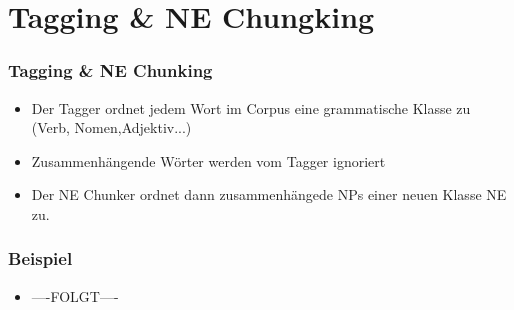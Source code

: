 \section{Tagging \& NE Chungking}

\begin{frame}
  \frametitle{Tagging \& NE Chunking}
  \begin{itemize}
    \item Der Tagger ordnet jedem Wort im Corpus eine grammatische Klasse zu (Verb, Nomen,Adjektiv...)
    \item Zusammenhängende Wörter werden vom Tagger ignoriert
    \item Der NE Chunker ordnet dann zusammenhängede NPs einer neuen Klasse NE zu.
  \end{itemize}
\end{frame}

\begin{frame}
  \frametitle{Beispiel}
  \begin{itemize}
    \item ----FOLGT----
  \end{itemize}
\end{frame}
